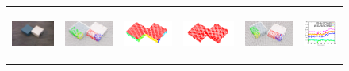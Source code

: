 \begin{figure}[ht!]  %
  \begin{centering} 
    \begin{tabular}{p{}p{}p{}p{}p{}p{}}
    \includegraphics[height=1.65cm]{figures/scene1/image_before.jpg}
&    \includegraphics[height=1.65cm]{figures/scene1/pcl_before.png}
&    \includegraphics[height=1.65cm]{figures/scene1/segments.png}
&    \includegraphics[height=1.65cm]{figures/scene1/labels.png}
&    \includegraphics[height=1.65cm]{figures/scene1/pcl_after.png}    
&    \includegraphics[height=1.65cm]{figures/scene1/distances.png}\\


\end{tabular}
\end{centering}
\end{figure}
